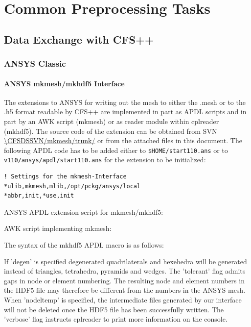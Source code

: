 \chapter{Common Preprocessing Tasks}

\section{Data Exchange with CFS++}

\subsection{ANSYS Classic}
\label{sec:preproc_ansys}

\subsubsection{ANSYS mkmesh/mkhdf5 Interface}
\label{sec:ansys_mkmesh_mkhdf5}
The extensions to ANSYS for writing out the mesh to either the .mesh or to the
.h5 format readable  by CFS++ are implemented  in part as APDL  scripts and in
part by an AWK script (mkmesh)  or as reader module within cplreader (mkhdf5).
The   source   code   of   the    extension   can   be   obtained   from   SVN
\url{\CFSDSSVN/mkmesh/trunk/}  or from  the attached  files in  this document.
The following APDL code has to be added either to {\tt \$HOME/start110.ans} or
to {\tt v110/ansys/apdl/start110.ans} for the extension to be initialized:

\begin{verbatim}
! Settings for the mkmesh-Interface
*ulib,mkmesh,mlib,/opt/pckg/ansys/local
*abbr,init,*use,init
\end{verbatim}

\noindent ANSYS APDL extension script for mkmesh/mkhdf5:

\noindent AWK script implementing mkmesh:

\noindent The syntax of the mkhdf5 APDL macro is as follows:


If  'degen' is  specified  degenerated quadrilaterals  and  hexehedra will  be
generated  instead  of  triangles,   tetrahedra,  pyramids  and  wedges.   The
'tolerant' flag admits  gaps in node or element  numbering. The resulting node
and  element numbers  in the  HDF5 file  may therefore  be different  from the
numbers in  the ANSYS  mesh. When 'nodeltemp'  is specified,  the intermediate
files generated  by our interface will not  be deleted once the  HDF5 file has
been  successfully written. The  'verbose' flag  instructs cplreader  to print
more information on the console.

